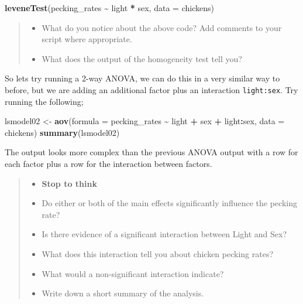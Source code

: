 \documentclass[
]{book}
\newenvironment{Shaded}{\begin{snugshade}}{\end{snugshade}}
\newcommand{\AttributeTok}[1]{\textcolor[rgb]{0.13,0.29,0.53}{#1}}
\newcommand{\FunctionTok}[1]{\textcolor[rgb]{0.13,0.29,0.53}{\textbf{#1}}}
\newcommand{\NormalTok}[1]{#1}
\newcommand{\OtherTok}[1]{\textcolor[rgb]{0.56,0.35,0.01}{#1}}
\newcommand{\SpecialCharTok}[1]{\textcolor[rgb]{0.81,0.36,0.00}{\textbf{#1}}}
\providecommand{\tightlist}{%
  \setlength{\itemsep}{0pt}\setlength{\parskip}{0pt}}
\begin{document}
\begin{Shaded}
\begin{Highlighting}[]
\FunctionTok{leveneTest}\NormalTok{(pecking\_rates }\SpecialCharTok{\textasciitilde{}}\NormalTok{ light }\SpecialCharTok{*}\NormalTok{ sex, }\AttributeTok{data =}\NormalTok{ chickens)}
\end{Highlighting}
\end{Shaded}

\begin{quote}
\begin{itemize}
\tightlist
\item
  What do you notice about the above code? Add comments to your script where appropriate.
\item
  What does the output of the homogeneity test tell you?
\end{itemize}
\end{quote}

So lets try running a 2-way ANOVA, we can do this in a very similar way to before, but we are adding an additional factor plus an interaction \texttt{light:sex}. Try running the following;

\begin{Shaded}
\begin{Highlighting}[]
\NormalTok{lsmodel02 }\OtherTok{\textless{}{-}} \FunctionTok{aov}\NormalTok{(}\AttributeTok{formula =}\NormalTok{ pecking\_rates }\SpecialCharTok{\textasciitilde{}}\NormalTok{ light }\SpecialCharTok{+}\NormalTok{ sex }\SpecialCharTok{+}\NormalTok{ light}\SpecialCharTok{:}\NormalTok{sex, }\AttributeTok{data =}\NormalTok{ chickens)}
\FunctionTok{summary}\NormalTok{(lsmodel02)}
\end{Highlighting}
\end{Shaded}

The output looks more complex than the previous ANOVA output with a row for each factor plus a row for the interaction between factors.

\begin{quote}
\begin{itemize}
\tightlist
\item
  \textbf{Stop to think}
\item
  Do either or both of the main effects significantly influence the pecking rate?
\item
  Is there evidence of a significant interaction between Light and Sex?
\item
  What does this interaction tell you about chicken pecking rates?
\item
  What would a non-significant interaction indicate?
\item
  Write down a short summary of the analysis.
\end{itemize}
\end{quote}
\end{document}
